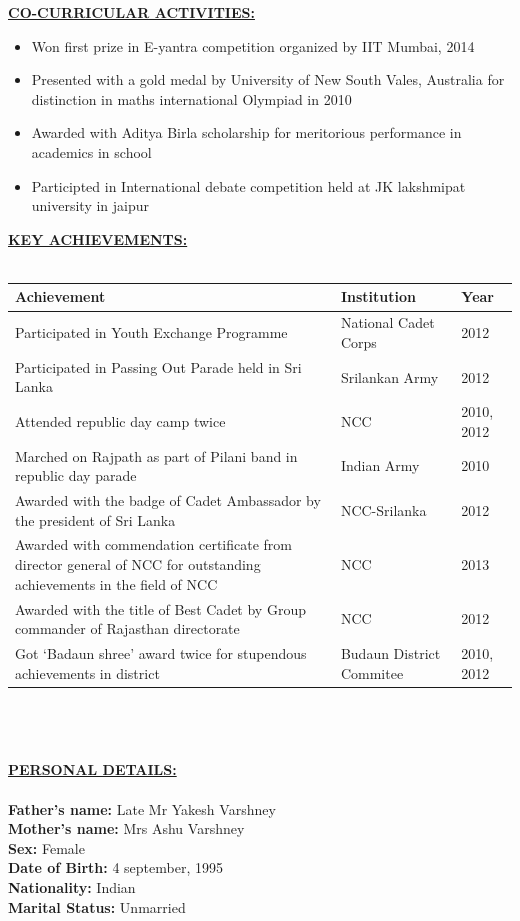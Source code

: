 \documentclass{article}
\begin{document}
				\underline{\textbf{CO-CURRICULAR ACTIVITIES:}}\\
				\begin{itemize}
					\item Won first prize in E-yantra competition organized by IIT Mumbai, 2014
					\item Presented with a gold medal by University of New South Vales, Australia for distinction in maths international Olympiad in 2010
					\item Awarded with Aditya Birla scholarship for meritorious performance in academics in school
					\item Participted in International debate competition held at JK lakshmipat university in jaipur
					\\[\baselineskip] 
				\end{itemize}
				\underline{\textbf{KEY ACHIEVEMENTS:}}\\
				\\
				\begin{tabular}{|p{6cm}|p{5cm}|p{4cm}|}
					\hline
					\textbf{Achievement} & \textbf{Institution} & \textbf{Year}\\
					\hline
					Participated in Youth Exchange Programme & National Cadet Corps & 2012 \\
					\hline
					Participated in Passing Out  Parade held in Sri Lanka & Srilankan Army & 2012 \\
					\hline
					Attended republic day camp  twice & NCC & 2010, 2012 \\
					\hline
					Marched on Rajpath as  part of Pilani band in republic day parade & Indian Army & 2010\\
					\hline
					Awarded with the badge of Cadet Ambassador by the president of Sri Lanka& NCC-Srilanka & 2012 \\
					\hline
					Awarded with  commendation certificate from director general of NCC for outstanding achievements in the field of NCC & NCC & 2013 \\
					\hline
					Awarded with the title of Best Cadet by Group commander of Rajasthan directorate & NCC & 2012 \\
					\hline
					Got ‘Badaun shree’ award twice for stupendous achievements in district & Budaun District Commitee & 2010, 2012 \\
					\hline
				\end{tabular}
				\\
				\\
				\\
				\underline{\textbf{PERSONAL DETAILS:}}\\
				\\
				\textbf{Father's name:} Late Mr Yakesh Varshney\\
				\textbf{Mother's name:} Mrs Ashu Varshney\\
				\textbf{Sex:} Female\\
				\textbf{Date of Birth:} 4 september, 1995\\
				\textbf{Nationality:} Indian\\
				\textbf{Marital Status:} Unmarried\\
				\\
			
\end{document}

